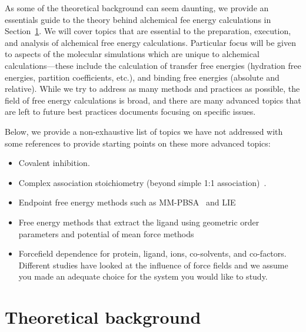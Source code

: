 \documentclass[9pt,bestpractices]{livecoms}
\begin{document}
As some of the theoretical background can seem daunting, we provide an essentials guide to the theory behind alchemical fee energy calculations in Section~\ref{sec:theory}. 
We will cover topics that are essential to the  preparation, execution, and analysis of alchemical free energy calculations. 
Particular focus will be given to aspects of the molecular simulations which are unique to alchemical calculations---these include the calculation of transfer free energies (hydration free energies, partition coefficients, etc.), and binding free energies (absolute and relative).
While we try to address as many methods and practices as possible, the field of free energy calculations is broad, and there are many advanced topics that are left to future best practices documents focusing on specific issues. 

Below, we provide a non-exhaustive list of topics we have not addressed with some references to provide starting points on these more advanced topics:
\begin{itemize}
\item Covalent inhibition.
\item Complex association stoichiometry (beyond simple 1:1 association)~\cite{awesome reference}. 
\item Endpoint free energy methods such as MM-PBSA~\cite{genheden2015mm} and LIE~\cite{gutierrez-de-terran2012linear}
\item Free energy methods that extract the ligand using geometric order parameters and potential of mean force methods~\cite{heinzelmann2017attachpullrelease}
\item Forcefield dependence for protein, ligand, ions, co-solvents, and co-factors. Different studies have looked at the influence of force fields and we assume you made an adequate choice for the system you would like to study.~\cite{loeffler2018reproducibility, vassetti2019assessment, lopes2015current} 
\end{itemize}


\section{Theoretical background}
\label{sec:theory}
\end{document}
